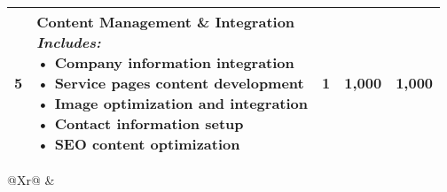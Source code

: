 \documentclass[11pt,a4paper]{article}
\begin{document}
\begin{tabularx}{\textwidth}{@{}p{1cm}Xrrr@{}}
     5 & \parbox[t]{8cm}{
         \textbf{Content Management \& Integration} \\
         \vspace{0.2cm}
         \textit{Includes:} \\
         • Company information integration \\
         • Service pages content development \\
         • Image optimization and integration \\
         • Contact information setup \\
         • SEO content optimization
     } & 1 & 1,000 & 1,000 \\
    
    \bottomrule
\end{tabularx}

\vspace{0.5cm}

\begin{tabularx}{\textwidth}{@{}Xr@{}}
    & \\[-0.3cm]
     \\
\end{tabularx}

\vspace{1cm}
\end{document}
